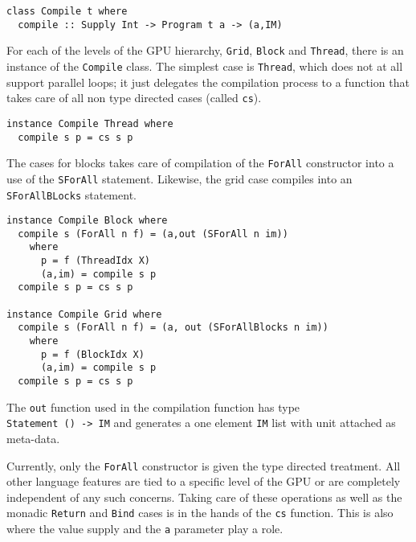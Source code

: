 \begin{small} 
\begin{Verbatim}[samepage=true] 
class Compile t where
  compile :: Supply Int -> Program t a -> (a,IM)
\end{Verbatim} 
\end{small} 

For each of the levels of the GPU hierarchy, {\tt Grid}, {\tt Block} and {\tt Thread},
there is an instance of the {\tt Compile} class. The simplest case is {\tt Thread},
which does not at all support parallel loops; it just delegates the compilation 
process to a function that takes care of all non type directed cases (called {\tt cs}).



\begin{small} 
\begin{Verbatim}[samepage=true] 
instance Compile Thread where 
  compile s p = cs s p 
\end{Verbatim} 
\end{small} 

The cases for blocks takes care of compilation of the {\tt ForAll} 
constructor into a use of the {\tt SForAll} statement. Likewise, the 
grid case compiles into an {\tt SForAllBLocks} statement. 


\begin{small} 
\begin{Verbatim}[samepage=true] 
instance Compile Block where
  compile s (ForAll n f) = (a,out (SForAll n im))
    where
      p = f (ThreadIdx X)
      (a,im) = compile s p
  compile s p = cs s p 

instance Compile Grid where
  compile s (ForAll n f) = (a, out (SForAllBlocks n im))
    where 
      p = f (BlockIdx X)
      (a,im) = compile s p
  compile s p = cs s p

\end{Verbatim} 
\end{small} 

The {\tt out} function used in the compilation function has type \\ {\tt Statement () -> IM}
and generates a one element {\tt IM} list with unit attached as meta-data. 

Currently, only the {\tt ForAll} constructor is given the type directed treatment. 
All other language features are tied to a specific level of the GPU or are
completely independent of any such concerns. Taking care of these operations 
as well as the monadic {\tt Return} and {\tt Bind} cases is in the hands of the 
{\tt cs} function. This is also where the value supply and the {\tt a} parameter 
play a role. 

